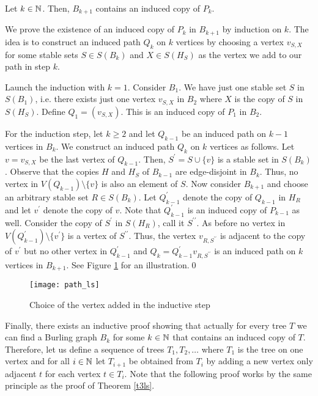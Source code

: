 \begin{thm}\label{t3ls}
Let $k\in\mathbb{N}$. Then, $B_{k+1}$ contains an induced copy of $P_k$.
\end{thm}
\begin{prf}
We prove the existence of an induced copy of $P_k$ in $B_{k+1}$ by induction on $k$. The idea is to construct an induced path $Q_k$ on $k$ vertices by choosing a vertex $v_{S,X}$ for some stable sets $S\in S(B_k)$ and $X\in S(H_S)$ as the vertex we add to our path in step $k$.

Launch the induction with $k=1$. Consider $B_1$. We have just one stable set $S$ in $S(B_1)$, i.e. there exists just one vertex $v_{S,X}$ in $B_2$ where $X$ is the copy of $S$ in $S(H_S)$. Define $Q_1=(v_{S,X})$. This is an induced copy of $P_1$  in $B_2$.

For the induction step, let $k\geq 2$ and let $Q_{k-1}$ be an induced path on $k-1$ vertices in $B_k$. We construct an induced path $Q_k$ on $k$ vertices as follows. Let $v=v_{S,X}$ be the last vertex of $Q_{k-1}$. Then, $S^\prime = S\cup \lbrace v\rbrace$ is a stable set in $S(B_k)$. Observe that the copies $H$ and $H_S$ of $B_{k-1}$ are edge-disjoint in $B_k$. Thus, no vertex in $V(Q_{k-1})\setminus\lbrace v\rbrace$ is also an element of $S$. Now consider $B_{k+1}$ and choose an arbitrary stable set $R\in S(B_k)$. Let $Q_{k-1}^\prime$ denote the copy of $Q_{k-1}$ in $H_R$ and let $v^\prime$ denote the copy of $v$. Note that $Q_{k-1}^\prime$ is an induced copy of $P_{k-1}$ as well. Consider the copy of $S^\prime$ in $S(H_R)$, call it $S^{\prime\prime}$. As before no vertex in $V(Q_{k-1}^\prime )\setminus\lbrace v^\prime\rbrace$ is a vertex of $S^{\prime\prime}$. Thus, the vertex $v_{R,S^{\prime\prime}}$ is adjacent to the copy of $v^\prime$ but no other vertex in $Q_{k-1}^\prime$ and $Q_k=Q_{k-1}^\prime v_{R,S^{\prime\prime}}$ is an induced path on $k$ vertices in $B_{k+1}$. See Figure \ref{f3ls} for an illustration.\qed
\end{prf}

\begin{figure}[ht]
\begin{center}
\texttt{[image: path\_ls]}
\end{center}
\caption{Choice of the vertex added in the inductive step}
\label{f3ls}
\end{figure}

Finally, there exists an inductive proof showing that actually for every tree $T$ we can find a Burling graph $B_k$ for some $k\in\mathbb{N}$ that contains an induced copy of $T$. Therefore, let us define a sequence of trees $T_1, T_2, \dots$ where $T_1$ is the tree on one vertex and for all $i\in\mathbb{N}$ let $T_{i+1}$ be obtained from $T_i$ by adding a new vertex only adjacent $t$ for each vertex $t\in T_i$. Note that the following proof works by the same principle as the proof of Theorem \ref{t3ls}.

